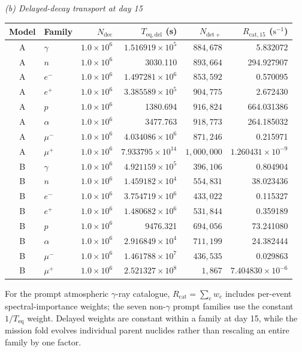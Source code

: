 \documentclass[11pt]{article}
\newcommand{\revblue}[1]{\textcolor{revisionblue}{#1}}
\begin{document}
\begin{table}[!htbp]
\vspace{0.45em}
\noindent\textit{(b) Delayed-decay transport at day 15}\par\vspace{0.20em}
\begin{tabular}{clrrrr}
\toprule
Model & Family & $N_{\mathrm{dec}}$ & $T_{\mathrm{eq,del}}$ (s)
& $N_{\mathrm{det+}}$ & $R_{\mathrm{cat},15}$ ($\mathrm{s^{-1}}$) \\
\midrule
A & $\gamma$ & $1.0\times10^6$ & $1.516919\times10^5$ & $884{,}678$ & 5.832072 \\
A & $n$ & $1.0\times10^6$ & 3030.110 & $893{,}664$ & 294.927907 \\
A & $e^-$ & $1.0\times10^6$ & $1.497281\times10^6$ & $853{,}592$ & 0.570095 \\
A & $e^+$ & $1.0\times10^6$ & $3.385589\times10^5$ & $904{,}775$ & 2.672430 \\
A & $p$ & $1.0\times10^6$ & 1380.694 & $916{,}824$ & 664.031386 \\
A & $\alpha$ & $1.0\times10^6$ & 3477.763 & $918{,}773$ & 264.185032 \\
A & $\mu^-$ & $1.0\times10^6$ & $4.034086\times10^6$ & $871{,}246$ & 0.215971 \\
A & $\mu^+$ & $1.0\times10^6$ & $7.933795\times10^{14}$ & $1{,}000{,}000$ & $1.260431\times10^{-9}$ \\
\addlinespace[0.25em]
B & $\gamma$ & $1.0\times10^6$ & $4.921159\times10^5$ & $396{,}106$ & 0.804904 \\
B & $n$ & $1.0\times10^6$ & $1.459182\times10^4$ & $554{,}831$ & 38.023436 \\
B & $e^-$ & $1.0\times10^6$ & $3.754719\times10^6$ & $433{,}022$ & 0.115327 \\
B & $e^+$ & $1.0\times10^6$ & $1.480682\times10^6$ & $531{,}844$ & 0.359189 \\
B & $p$ & $1.0\times10^6$ & 9476.321 & $694{,}056$ & 73.241080 \\
B & $\alpha$ & $1.0\times10^6$ & $2.916849\times10^4$ & $711{,}199$ & 24.382444 \\
B & $\mu^-$ & $1.0\times10^6$ & $1.461788\times10^7$ & $436{,}535$ & 0.029863 \\
B & $\mu^+$ & $1.0\times10^6$ & $2.521327\times10^8$ & $1{,}867$ & $7.404830\times10^{-6}$ \\
\bottomrule
\end{tabular}

\vspace{0.35em}
\parbox{0.97\linewidth}{\raggedright For the \revblue{prompt atmospheric $\gamma$-ray}
catalogue, $R_{\mathrm{cat}}=\sum_e w_e$ includes per-event spectral-importance
weights; the seven non-$\gamma$ prompt families use the constant
$1/T_{\mathrm{eq}}$ weight. Delayed weights are constant within a family at day
15, while the mission fold evolves individual parent nuclides rather than
rescaling an entire family by one factor.}
\end{table}
\endgroup
\end{document}
